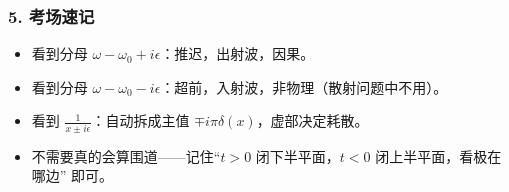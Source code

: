 \begin{derivationbox}
\subsubsection*{5. 考场速记}
\begin{itemize}
    \item 看到分母 $\omega - \omega_0 + i\epsilon$：推迟，出射波，因果。
    \item 看到分母 $\omega - \omega_0 - i\epsilon$：超前，入射波，非物理（散射问题中不用）。
    \item 看到 $\frac{1}{x \pm i\epsilon}$：自动拆成主值 $\mp i\pi\delta(x)$，虚部决定耗散。
    \item 不需要真的会算围道——记住``$t > 0$ 闭下半平面，$t < 0$ 闭上半平面，看极在哪边'' 即可。
\end{itemize}
\end{derivationbox}

